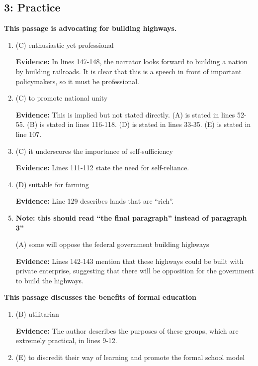 \begin{enumerate}
\subsection{3: Practice}

\textbf{This passage is advocating for building highways.}

\begin{enumerate}
\item (C) enthusiastic yet professional

\textbf{Evidence:} In lines 147-148, the narrator looks forward to building a nation by building railroads. It is clear that this is a speech in front of important policymakers, so it must be professional. 

\bigskip
\item (C) to promote national unity

\textbf{Evidence:} This is implied but not stated directly. (A) is stated in lines 52-55. (B) is stated in lines 116-118. (D) is stated in lines 33-35. (E) is stated in line 107.

\bigskip
\item (C) it underscores the importance of self-sufficiency

\textbf{Evidence:} Lines 111-112 state the need for self-reliance. 

\bigskip
\item (D) suitable for farming

\textbf{Evidence:} Line 129 describes lands that are ``rich''.

\bigskip
\item \textbf{Note: this should read ``the final paragraph'' instead of paragraph 3''}

(A) some will oppose the federal government building highways

\textbf{Evidence:} Lines 142-143 mention that these highways could be built with private enterprise, suggesting that there will be opposition for the government to build the highways. 
\end{enumerate}

\textbf{This passage discusses the benefits of formal education}

\begin{enumerate}
\item (B) utilitarian

\textbf{Evidence:} The author describes the purposes of these groups, which are extremely practical, in lines 9-12.

\bigskip
\item (E) to discredit their way of learning and promote the formal school model


\end{enumerate}
\end{enumerate}

